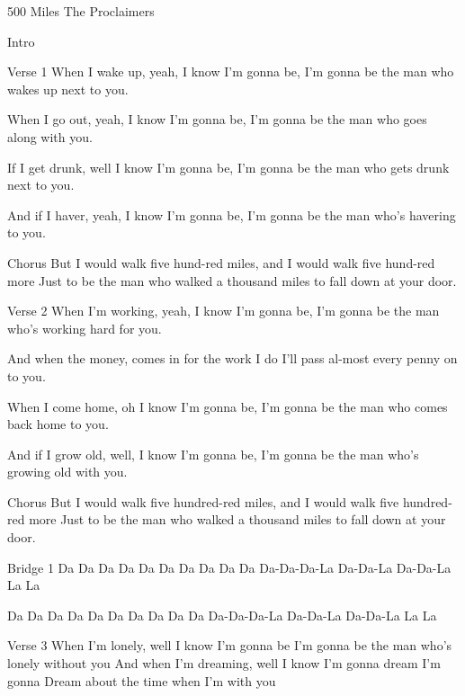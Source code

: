 \begin{song}{500 Miles The Proclaimers}{}{}{}{}{}

Intro

Verse 1
When I wake up, yeah, I know I'm gonna be,
I'm gonna be the man who wakes up next to you.

When I go out, yeah, I know I'm gonna be,
I'm gonna be the man who goes along with you.

If I get drunk, well I know I'm gonna be,
I'm gonna be the man who gets drunk next to you.

And if I haver, yeah, I know I'm gonna be,
I'm gonna be the man who's havering to you.

Chorus
But I would walk  five hund-red miles, and
I    would     walk    five hund-red    more
Just to be the man who walked a thousand miles
to fall down at your door.    


Verse 2
When I'm working, yeah, I know I'm gonna be,
I'm gonna be the man who's working hard for you.

And when the money,    comes in for the work I do
I'll pass al-most every penny on to you.

When I come home, oh I know I'm gonna be,
I'm gonna be the man who comes back home to you.

And if I grow old, well, I know I'm gonna be,
I'm gonna be the man who's growing old with you.


Chorus
But I would walk five hundred-red miles, and
I would walk five hundred-red more
Just to be the man who walked a thousand miles
to fall down at your door.    



Bridge 1
Da Da Da Da          Da Da Da Da      Da Da Da-Da-Da-La Da-Da-La Da-Da-La La La

Da Da Da Da           Da Da Da Da      Da Da Da-Da-Da-La Da-Da-La Da-Da-La La La



Verse 3
When I'm lonely, well I know I'm gonna be
I'm gonna be the man who's lonely without you
And when I'm dreaming, well I know I'm gonna dream
I'm gonna Dream about the time when I'm with you


\end{song}
